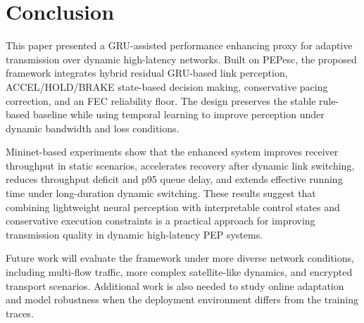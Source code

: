 \section{Conclusion}
\label{sec:conclusion}

This paper presented a GRU-assisted performance enhancing proxy for adaptive transmission over dynamic high-latency networks. Built on PEPesc, the proposed framework integrates hybrid residual GRU-based link perception, ACCEL/HOLD/BRAKE state-based decision making, conservative pacing correction, and an FEC reliability floor. The design preserves the stable rule-based baseline while using temporal learning to improve perception under dynamic bandwidth and loss conditions.

Mininet-based experiments show that the enhanced system improves receiver throughput in static scenarios, accelerates recovery after dynamic link switching, reduces throughput deficit and p95 queue delay, and extends effective running time under long-duration dynamic switching. These results suggest that combining lightweight neural perception with interpretable control states and conservative execution constraints is a practical approach for improving transmission quality in dynamic high-latency PEP systems.

Future work will evaluate the framework under more diverse network conditions, including multi-flow traffic, more complex satellite-like dynamics, and encrypted transport scenarios. Additional work is also needed to study online adaptation and model robustness when the deployment environment differs from the training traces.
